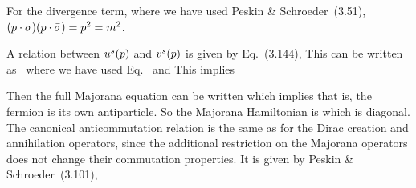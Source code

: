 {	For the divergence term,
	where we have used Peskin \& Schroeder~(3.51), $(p \cdot \sigma) (p \cdot \bar{\sigma}) = p^2 = m^2$.
	
	A relation between $u^s(p)$ and $v^s(p)$ is given by Eq.~(3.144),
	This can be written as~\cite[p.~70]{Peskin}
	where we have used Eq.~ and
	This implies
	
	Then the full Majorana equation can be written
	which implies
	\eq{
		\avps = \bvps;
	}
	that is, the fermion is its own antiparticle.  So the Majorana Hamiltonian is
	which is diagonal.  The canonical anticommutation relation is the same as for the Dirac creation and annihilation operators, since the additional restriction on the Majorana operators does not change their commutation properties.  It is given by Peskin \& Schroeder~(3.101),
}